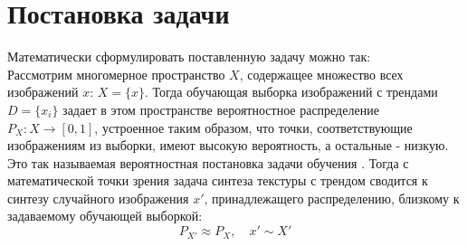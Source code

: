 \section{Постановка задачи}
	Математически сформулировать поставленную задачу можно так: \\
	Рассмотрим многомерное пространство $X$, содержащее множество всех изображений $x$: $X = \{x\}$. Тогда обучающая выборка изображений с трендами $D = \{x_i\}$ задает в этом пространстве вероятностное распределение $P_X : X \longrightarrow [0,1]$, устроенное таким образом, что точки, соответствующие изображениям из выборки, имеют высокую вероятность, а остальные - низкую. Это так называемая вероятностная постановка задачи обучения \cite{Voron-ML, GAN}. Тогда с математической точки зрения задача синтеза текстуры с трендом сводится к синтезу случайного изображения $x'$, принадлежащего распределению, близкому к задаваемому обучающей выборкой:
	$$ P_{X'} \approx P_X, \quad x' \sim X'$$